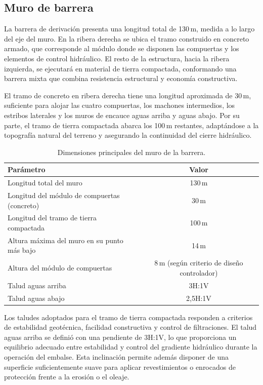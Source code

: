 \documentclass{article} %
\begin{document}
\subsection{Muro de barrera}

La barrera de derivación presenta una longitud total de 130\,m, medida a lo largo del eje del muro. En la ribera derecha se ubica el tramo construido en concreto armado, que corresponde al módulo donde se disponen las compuertas y los elementos de control hidráulico. El resto de la estructura, hacia la ribera izquierda, se ejecutará en material de tierra compactada, conformando una barrera mixta que combina resistencia estructural y economía constructiva.

El tramo de concreto en ribera derecha tiene una longitud aproximada de 30\,m, suficiente para alojar las cuatro compuertas, los machones intermedios, los estribos laterales y los muros de encauce aguas arriba y aguas abajo. Por su parte, el tramo de tierra compactada abarca los 100\,m restantes, adaptándose a la topografía natural del terreno y asegurando la continuidad del cierre hidráulico.

\begin{table}[htbp]
\centering
\begin{tabular}{lc}
\hline
\textbf{Parámetro} & \textbf{Valor} \\
\hline
Longitud total del muro & 130\,m \\
Longitud del módulo de compuertas (concreto) & 30\,m \\
Longitud del tramo de tierra compactada & 100\,m \\
Altura máxima del muro en su punto más bajo & 14\,m \\
Altura del módulo de compuertas & 8\,m (según criterio de diseño controlador) \\
Talud aguas arriba & 3H:1V \\
Talud aguas abajo & 2{,}5H:1V \\
\hline
\end{tabular}
\caption{Dimensiones principales del muro de la barrera.}
\label{tab:dimensiones_muro}
\end{table}

Los taludes adoptados para el tramo de tierra compactada responden a criterios de estabilidad geotécnica, facilidad constructiva y control de filtraciones. El talud aguas arriba se definió con una pendiente de 3H:1V, lo que proporciona un equilibrio adecuado entre estabilidad y control del gradiente hidráulico durante la operación del embalse. Esta inclinación permite además disponer de una superficie suficientemente suave para aplicar revestimientos o enrocados de protección frente a la erosión o el oleaje.
\end{document}
